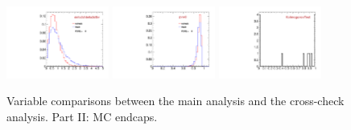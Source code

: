 \begin{figure}
  \includegraphics[width=0.3\textwidth]{Figures/VariablesComparison/MC_endcaps_figs/pvips}
  \includegraphics[width=0.3\textwidth]{Figures/VariablesComparison/MC_endcaps_figs/pvw8}
  \includegraphics[width=0.3\textwidth]{Figures/VariablesComparison/MC_endcaps_figs/KS}
  \caption{Variable comparisons between the main analysis and the cross-check analysis. Part II: MC endcaps.}
  \label{fig:MC_endcaps_figs}
\end{figure}


